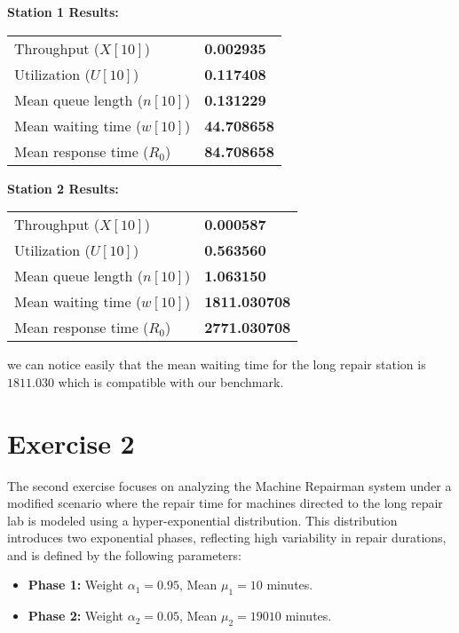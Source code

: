 \documentclass[12pt]{article}
\begin{document}
	\noindent\textbf{Station 1 Results:}
	\begin{table}[h!]
		\centering
		\begin{tabular}{@{}l l@{}}
			\toprule
			Throughput ($X[10]$)              & \textbf{0.002935} \\
			Utilization ($U[10]$)             & \textbf{0.117408} \\
			Mean queue length ($n[10]$)       & \textbf{0.131229} \\
			Mean waiting time ($w[10]$)       & \textbf{44.708658} \\
			Mean response time ($R_0$)        & \textbf{84.708658} \\
			\bottomrule
		\end{tabular}
	\end{table}
	
	\noindent\textbf{Station 2 Results:}
	\begin{table}[h!]
		\centering
		\begin{tabular}{@{}l l@{}}
			\toprule
			Throughput ($X[10]$)              & \textbf{0.000587} \\
			Utilization ($U[10]$)             & \textbf{0.563560} \\
			Mean queue length ($n[10]$)       & \textbf{1.063150} \\
			Mean waiting time ($w[10]$)       & \textbf{1811.030708} \\
			Mean response time ($R_0$)        & \textbf{2771.030708} \\
			\bottomrule
		\end{tabular}
	\end{table}
	
	
	we can notice easily that the mean waiting time for the long repair station is $1811.030$ which is compatible with our benchmark. 
	
	\section{Exercise 2}
	The second exercise focuses on analyzing the Machine Repairman system under a modified scenario where the repair time for machines directed to the long repair lab is modeled using a hyper-exponential distribution. This distribution introduces two exponential phases, reflecting high variability in repair durations, and is defined by the following parameters:
	
	\begin{itemize}
		\item \textbf{Phase 1:} Weight $\alpha_1 = 0.95$, Mean $\mu_1 = 10$ minutes.
		\item \textbf{Phase 2:} Weight $\alpha_2 = 0.05$, Mean $\mu_2 = 19010$ minutes.
	\end{itemize}
	
\end{document}
